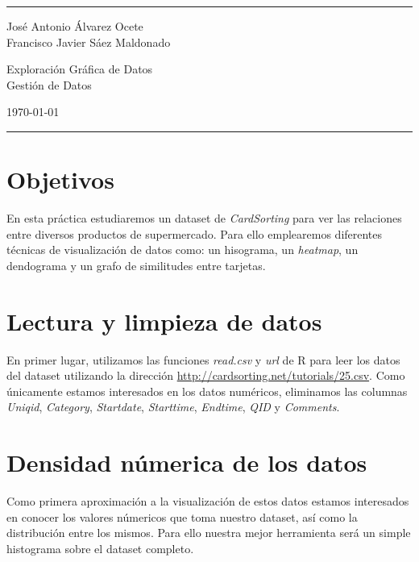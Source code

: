 \documentclass[a4paper]{article}
\begin{document}

\fancyhead[C]{}
\hrule \medskip %
\begin{minipage}{0.295\textwidth} 
	\raggedright
	\footnotesize
	José Antonio Álvarez Ocete \hfill\\   
	Francisco Javier Sáez Maldonado \hfill
\end{minipage}
\begin{minipage}{0.4\textwidth} 
	\centering 
	\large 
	Exploración Gráfica de Datos \\ 
	\normalsize 
	Gestión de Datos \\ 
\end{minipage}
\begin{minipage}{0.295\textwidth} 
	\raggedleft
	\today\hfill\\
\end{minipage}
\medskip\hrule 
\bigskip


\section{Objetivos}

En esta práctica estudiaremos un dataset de \emph{CardSorting} para ver las relaciones entre diversos productos de supermercado. Para ello emplearemos diferentes técnicas de visualización de datos como: un hisograma, un \emph{heatmap}, un dendograma y un grafo de similitudes entre tarjetas.

\section{Lectura y limpieza de datos}

En primer lugar, utilizamos las funciones \emph{read.csv} y \emph{url} de R para leer los datos del dataset utilizando la dirección \url{http://cardsorting.net/tutorials/25.csv}. Como únicamente estamos interesados en los datos numéricos, eliminamos las columnas \emph{Uniqid}, \emph{Category}, \emph{Startdate}, \emph{Starttime}, \emph{Endtime}, \emph{QID} y \emph{Comments}.

\section{Densidad númerica de los datos}

Como primera aproximación a la visualización de estos datos estamos interesados en conocer los valores númericos que toma nuestro dataset, así como la distribución entre los mismos. Para ello nuestra mejor herramienta será un simple histograma sobre el dataset completo.
\end{document}
